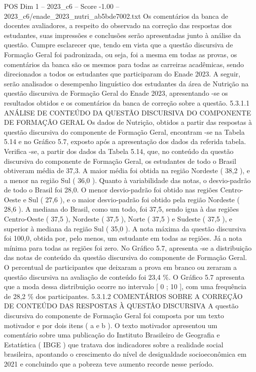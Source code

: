 \begin{textsample}{POS Dim 1 – 2023\_c6 – Score -1.00 – 2023\_c6/enade\_2023\_nutri\_ab5bde7002.txt}
Os comentários da banca de docentes avaliadores, a respeito do observado na correção das respostas dos estudantes, suas impressões e conclusões serão apresentadas junto à análise da questão.
Cumpre esclarecer que, tendo em vista que a questão discursiva de Formação Geral foi padronizada, ou seja, foi a mesma em todas as provas, os comentários da banca são os mesmos para todas as carreiras acadêmicas, sendo direcionados a todos os estudantes que participaram do Enade 2023.
A seguir, serão analisados o desempenho linguístico dos estudantes da área de Nutrição na questão discursiva de Formação Geral do Enade 2023, apresentando -se os resultados obtidos e os comentários da banca de correção sobre a questão. 5.3.1.1 ANÁLISE DE CONTEÚDO DA QUESTÃO DISCURSIVA DO COMPONENTE DE FORMAÇÃO GERAL Os dados de Nutrição, obtidos a partir das respostas à questão discursiva do componente de Formação Geral, encontram -se na Tabela 5.14 e no Gráfico 5.7, exposto após a apresentação dos dados da referida tabela.
Verifica -se, a partir dos dados da Tabela 5.14, que, no conteúdo da questão discursiva do componente de Formação Geral, os estudantes de todo o Brasil obtiveram média de 37,3.
A maior média foi obtida na região Nordeste ( 38,2 ), e a menor na região Sul ( 36,0 ).
Quanto à variabilidade das notas, o desvio-padrão de todo o Brasil foi 28,0.
O menor desvio-padrão foi obtido nas regiões Centro-Oeste e Sul ( 27,6 ), e o maior desvio-padrão foi obtido pela região Nordeste ( 28,6 ).
A mediana do Brasil, como um todo, foi 37,5, sendo igua à das regiões Centro-Oeste ( 37,5 ), Nordeste ( 37,5 ), Norte ( 37,5 ) e Sudeste ( 37,5 ), e superior à mediana da região Sul ( 35,0 ).
A nota máxima da questão discursiva foi 100,0, obtida por, pelo menos, um estudante em todas as regiões.
Já a nota mínima para todas as regiões foi zero.
No Gráfico 5.7, apresenta -se a distribuição das notas de conteúdo da questão discursiva do componente de Formação Geral.
O percentual de participantes que deixaram a prova em branco ou zeraram a questão discursiva na avaliação de conteúdo foi 23,4 \%.
O Gráfico 5.7 apresenta que a moda dessa distribuição ocorre no intervalo [ 0 ; 10 ], com uma frequência de 28,2 \% dos participantes. 5.3.1.2 COMENTÁRIOS SOBRE A CORREÇÃO DE CONTEÚDO DAS RESPOSTAS À QUESTÃO DISCURSIVA A questão discursiva do componente de Formação Geral foi composta por um texto motivador e por dois itens ( a e b ).
O texto motivador apresentou um comentário sobre uma publicação do Instituto Brasileiro de Geografia e Estatística ( IBGE ) que tratava dos indicadores sobre a realidade social brasileira, apontando o crescimento do nível de desigualdade socioeconômica em 2021 e concluindo que a pobreza teve aumento recorde nesse período.

\end{textsample}

